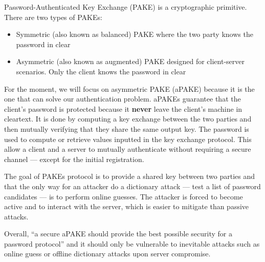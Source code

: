 \documentclass[../report.tex]{subfiles}
\begin{document}
Password-Authenticated Key Exchange (PAKE) is a cryptographic primitive. There are two types of PAKEs: 

\begin{itemize}
 \item Symmetric (also known as balanced) PAKE where the two party knows the password in clear
 \item Asymmetric (also known as augmented) PAKE designed for client-server scenarios. Only the client knows the password in clear
\end{itemize}

For the moment, we will focus on asymmetric PAKE (aPAKE) because it is the one that can solve our authentication problem.
aPAKEs guarantee that the client's password is protected because it \textbf{never} leave the client's machine in cleartext.
It is done by computing a key exchange between the two parties and then mutually verifying that they share the same output key. The password is used to compute or retrieve values inputted in the key exchange protocol.
This allow a client and a server to mutually authenticate without requiring a secure channel --- except for the initial registration.


The goal of PAKEs protocol is to provide a shared key between two parties and that the only way for an attacker do a dictionary attack --- test a list of password candidates --- is to perform online guesses. The attacker is forced to become active and to interact with the server, which is easier to mitigate than passive attacks.


Overall, ``a secure aPAKE should provide the best possible security for a password protocol'' \cite{OPAQUE_Standard_Draft} and it should only be vulnerable to inevitable attacks such as online guess or offline dictionary attacks upon server compromise.

\paragraph{}



\end{document}
